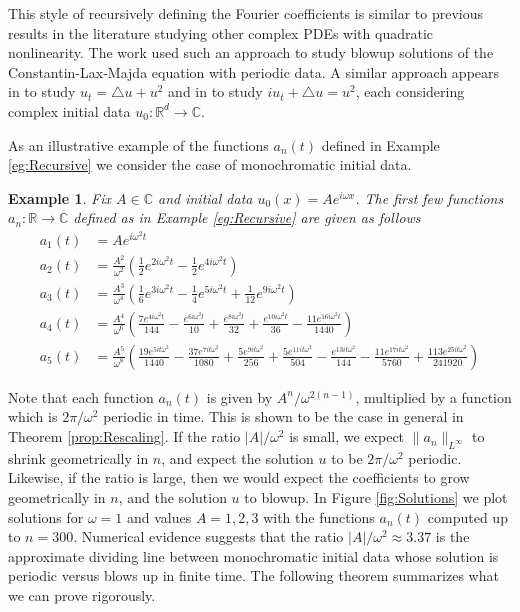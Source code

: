 \documentclass{article}
\newtheorem{example}[theorem]{Example}
\newcommand{\R}{\mathbb{R}}
\newcommand{\C}{\mathbb{C}}
\begin{document}
This style of recursively defining the Fourier coefficients is similar to previous results in the literature studying other complex PDEs with quadratic nonlinearity. 
The work \cite{sakajo2003blow} used such an approach to study blowup solutions of the Constantin-Lax-Majda  equation with periodic data. 
A similar approach appears in  \cite{guo2013convergence} to study $ u_t = \triangle u + u^2$ and in 
\cite{bejenaru2006sharp,iwabuchi2015ill} to study $ i u_t + \triangle u = u^2$, each considering complex  initial data $u_0 :\R^d \to \C$.  

As an illustrative example of the functions $a_n(t)$ defined in Example \ref{eg:Recursive}  we consider the case of monochromatic initial data.  
\begin{example} \label{eg:ExplicitFunctions}
	Fix $ A \in \C$ and initial data $ u_0(x) = A e^{i \omega x}$. 
	The first few functions $ a_n : \R \to \C$ defined as in Example \ref{eg:Recursive} are given as follows 
	\begin{align*}
		a_1(t) &= A e^{i \omega^2 t} \\
		a_2(t) &= \frac{A^2}{\omega^2} 
		\left( \frac{1}{2} e^{2 i \omega^2  t}  - \frac{1}{2} e^{4 i \omega^2  t}  \right)\\
		a_3(t) &=  \frac{A^3}{\omega^4}
		\left( \frac{1}{6} e^{3 i \omega^2  t}
		- \frac{1}{4} e^{5 i \omega^2  t} 
		+ \frac{1}{12} e^{9 i \omega^2  t}  \right) \\
		a_4(t) &=  \frac{A^4}{\omega^6}
		\left(
		\frac{7 e^{4 i \omega ^2t}}{144 }-\frac{e^{6 i  \omega ^2t}}{10 }+\frac{e^{8 i  \omega ^2t}}{32 }+\frac{e^{10 i  \omega ^2t}}{36}-\frac{11 e^{16 i  \omega ^2t}}{1440 } 
		\right)  \\
		a_5(t) &= 	
		\frac{A^5}{\omega^8}	
				\left(
		\frac{19 e^{5 i t \omega ^2}}{1440 }-\frac{37 e^{7 i t \omega ^2}}{1080  }+\frac{5 e^{9 i t \omega ^2}}{256}+\frac{5 e^{11 i t \omega ^2}}{504  }-\frac{e^{13 i t \omega ^2}}{144 }-\frac{11 e^{17 i t
				\omega ^2}}{5760 }+\frac{113 e^{25 i t \omega ^2}}{241920  }
			\right)  
	\end{align*}
\end{example}


Note that each function $ a_n(t)$ is given by   $ A^n/ \omega^{2(n-1)}$, multiplied by a function which is $ 2 \pi /\omega^2$ periodic in time.  
This is shown to be the case in general in Theorem \ref{prop:Rescaling}. 
If the ratio $ |A|/\omega^2$ is small, we expect $ \| a_n\|_{L^\infty}$ to shrink geometrically in $n$, and expect the solution $u$ to be $2 \pi / \omega^2$ periodic. Likewise, if the ratio is large, then we would expect the coefficients to grow geometrically in $n$, and the solution  $u$ to blowup. 
 In Figure \ref{fig:Solutions} we plot  solutions for $\omega =1$ and values $ A =1,2,3$   with the  functions $a_n(t)$ computed up to $ n =300$. 
 Numerical evidence suggests that the ratio $|A|/\omega^2 \approx 3.37$ is the approximate dividing line between monochromatic initial data whose solution is periodic versus blows up in finite time. The following theorem summarizes what we can prove rigorously. 
 
\end{document}
